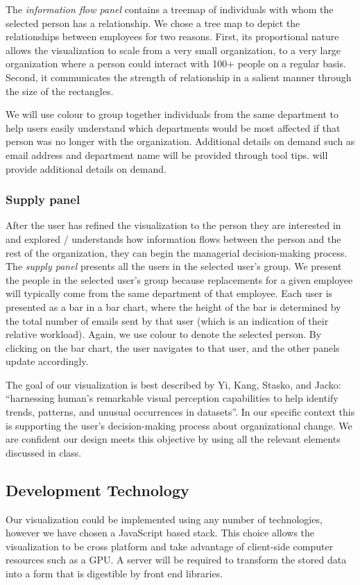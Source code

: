 \documentclass{soups}
\begin{document}
The \emph{information flow panel} contains a treemap of individuals with whom the selected person has a relationship. We chose a tree map to depict the relationships between employees for two reasons. First, its proportional nature allows the visualization to scale from a very small organization, to a very large organization where a person could interact with 100+ people on a regular basis. Second, it communicates the strength of relationship in a salient manner through the size of the rectangles.

We will use colour to group together individuals from the same department to help users easily understand which departments would be most affected if that person was no longer with the organization.  Additional details on demand\cite{anafigueiras} such as email address and department name will be provided through tool tips.  will provide additional details on demand. 

\subsubsection{Supply panel}

After the user has refined the visualization to the person they are interested in and explored / understands how information flows between the person and the rest of the organization, they can begin the managerial decision-making process. The \emph{supply panel} presents all the users in the selected user's group. We present the people in the selected user's group because replacements for a given employee will typically come from the same department of that employee. Each user is presented as a bar in a bar chart, where the height of the bar is determined by the total number of emails sent by that user (which is an indication of their relative workload). Again, we use colour to denote the selected person.  By clicking on the bar chart, the user navigates to that user, and the other panels update accordingly.

The goal of our visualization is best described by Yi, Kang, Stasko, and Jacko: “harnessing human’s remarkable visual perception capabilities to help identify trends, patterns, and unusual occurrences in datasets”\cite{yi2007toward}.  In our specific context this is supporting the user’s decision-making process about organizational change.  We are confident our design meets this objective by using all the relevant elements discussed in class.

\subsection{Development Technology}
Our visualization could be implemented using any number of technologies, however we have chosen a JavaScript based stack.  This choice allows the visualization to be cross platform and take advantage of client-side computer resources such as a GPU.  A server will be required to transform the stored data into a form that is digestible by front end libraries.
\end{document}
